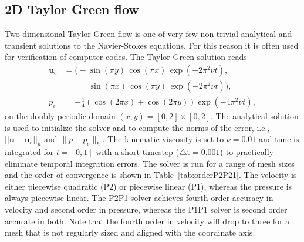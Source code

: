 \documentclass[final,3p,times,twocolumn]{elsarticle}
\begin{document}
\subsection{2D Taylor Green flow}
\label{sec:2DTG}
Two dimensional Taylor-Green flow is one of very few non-trivial analytical and transient solutions to the Navier-Stokes equations. For this reason it is often used for verification of computer codes. The Taylor Green solution reads
\begin{align}
  \bm{u}_e &= \Big(- \sin (\pi y) \, \cos (\pi x)\, \exp(-2 \pi^2 \nu t), \\
    &\quad\quad\quad \sin (\pi x) \, \cos (\pi y)\, \exp(-2 \pi^2 \nu t) \Big), \\
    p_e &= - \frac{1}{4}\left(\cos (2\pi x)+\cos(2 \pi y) \right) \exp(-4 \pi^2 \nu t),
\end{align}
on the doubly periodic domain $(x, y) = [0, 2]\times [0, 2]$. The analytical solution is used to initialize the solver and to compute the norms of the error, i.e., $||\bm{u}-\bm{u}_e||_h$ and $\| p - p_e\|_h$. The kinematic viscosity is set to $\nu=0.01$ and time is integrated for $t=[0, 1]$ with a short timestep ($\triangle \text{t} = 0.001$) to practically eliminate temporal integration errors. The solver is run for a range of mesh sizes and the order of convergence is shown in Table~\ref{tab:orderP2P21}. The velocity is either piecewise quadratic (P2) or piecewise linear (P1), whereas the pressure is always piecewise linear. The P2P1 solver achieves fourth order accuracy in velocity and second order in pressure, whereas the P1P1 solver is second order accurate in both. Note that the fourth order in velocity will drop to three for a mesh that is not regularly sized and aligned with the coordinate axis.
\end{document}
